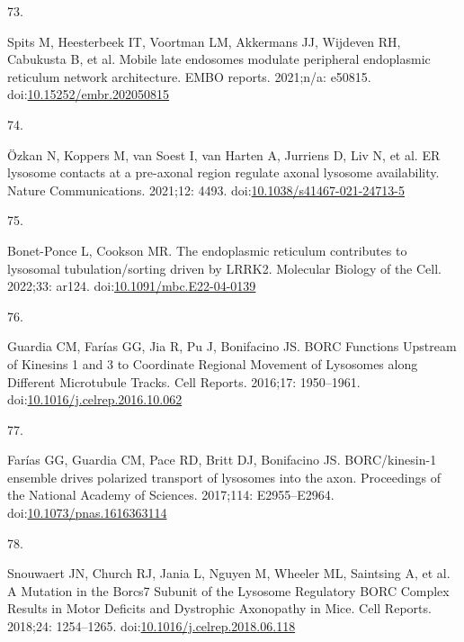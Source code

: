 \documentclass[
  12pt,
  a4paper,
]{book}
\newlength{\cslhangindent}
\newlength{\csllabelwidth}
\newlength{\cslentryspacingunit} %
\newenvironment{CSLReferences}[2] %
 {%
  \setlength{\parindent}{0pt}
  \ifodd #1
  \let\oldpar\par
  \def\par{\hangindent=\cslhangindent\oldpar}
  \fi
  \setlength{\parskip}{#2\cslentryspacingunit}
 }%
 {}
\newcommand{\CSLLeftMargin}[1]{\parbox[t]{\csllabelwidth}{#1}}
\newcommand{\CSLRightInline}[1]{\parbox[t]{\linewidth - \csllabelwidth}{#1}\break}
\begin{document}
\begin{CSLReferences}{0}{0}
\leavevmode{}%
\CSLLeftMargin{73. }%
\CSLRightInline{Spits M, Heesterbeek IT, Voortman LM, Akkermans JJ, Wijdeven RH, Cabukusta B, et al. Mobile late endosomes modulate peripheral endoplasmic reticulum network architecture. EMBO reports. 2021;n/a: e50815. doi:\href{https://doi.org/10.15252/embr.202050815}{10.15252/embr.202050815}}

\leavevmode{}%
\CSLLeftMargin{74. }%
\CSLRightInline{Özkan N, Koppers M, van Soest I, van Harten A, Jurriens D, Liv N, et al. {ER} \textendash{} lysosome contacts at a pre-axonal region regulate axonal lysosome availability. Nature Communications. 2021;12: 4493. doi:\href{https://doi.org/10.1038/s41467-021-24713-5}{10.1038/s41467-021-24713-5}}

\leavevmode{}%
\CSLLeftMargin{75. }%
\CSLRightInline{Bonet-Ponce L, Cookson MR. The endoplasmic reticulum contributes to lysosomal tubulation/sorting driven by {LRRK2}. Molecular Biology of the Cell. 2022;33: ar124. doi:\href{https://doi.org/10.1091/mbc.E22-04-0139}{10.1091/mbc.E22-04-0139}}

\leavevmode{}%
\CSLLeftMargin{76. }%
\CSLRightInline{Guardia CM, Farías GG, Jia R, Pu J, Bonifacino JS. {BORC Functions Upstream} of {Kinesins} 1 and 3 to {Coordinate Regional Movement} of {Lysosomes} along {Different Microtubule Tracks}. Cell Reports. 2016;17: 1950--1961. doi:\href{https://doi.org/10.1016/j.celrep.2016.10.062}{10.1016/j.celrep.2016.10.062}}

\leavevmode{}%
\CSLLeftMargin{77. }%
\CSLRightInline{Farías GG, Guardia CM, Pace RD, Britt DJ, Bonifacino JS. {BORC}/kinesin-1 ensemble drives polarized transport of lysosomes into the axon. Proceedings of the National Academy of Sciences. 2017;114: E2955--E2964. doi:\href{https://doi.org/10.1073/pnas.1616363114}{10.1073/pnas.1616363114}}

\leavevmode{}%
\CSLLeftMargin{78. }%
\CSLRightInline{Snouwaert JN, Church RJ, Jania L, Nguyen M, Wheeler ML, Saintsing A, et al. A {Mutation} in the {Borcs7 Subunit} of the {Lysosome Regulatory BORC Complex Results} in {Motor Deficits} and {Dystrophic Axonopathy} in {Mice}. Cell Reports. 2018;24: 1254--1265. doi:\href{https://doi.org/10.1016/j.celrep.2018.06.118}{10.1016/j.celrep.2018.06.118}}


\end{CSLReferences}
\end{document}

